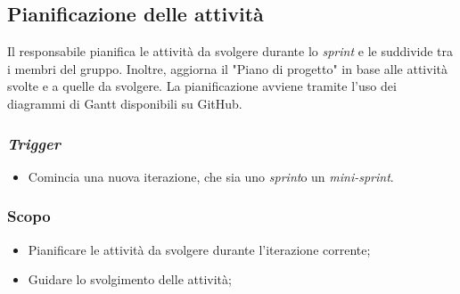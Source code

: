 \subsection{Pianificazione delle attività}
\label{pianificazione-attivia}

Il responsabile pianifica le attività da svolgere durante lo \textit{sprint}
e le suddivide tra i membri del gruppo. Inoltre, aggiorna il "Piano di progetto"
in base alle attività svolte e a quelle da svolgere. La pianificazione avviene
tramite l'uso dei diagrammi di Gantt disponibili su GitHub\g.

\subsubsection{\textit{Trigger}}
\begin{itemize}
	\item Comincia una nuova iterazione, che sia uno \textit{sprint}\g o un
	      \textit{mini-sprint}\g.
\end{itemize}

\subsubsection{Scopo}
\begin{itemize}
	\item Pianificare le attività da svolgere durante l'iterazione corrente;

	\item Guidare lo svolgimento delle attività;

\end{itemize}

